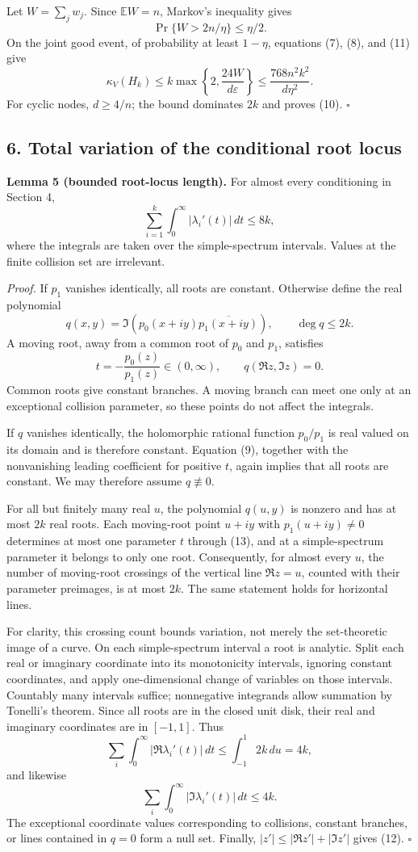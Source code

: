 \documentclass[
  11pt,
]{article}
\begin{document}
Let \(W=\sum_jw_j\). Since \(\mathbb EW=n\), Markov's inequality gives
\[
\Pr\{W>2n/\eta\}\leq\eta/2.
\] On the joint good event, of probability at least \(1-\eta\),
equations (7), (8), and (11) give \[
\kappa_V(H_k)
\leq k\max\left\{2,\frac{24W}{d\varepsilon}\right\}
\leq\frac{768n^2k^2}{d\eta^2}.
\] For cyclic nodes, \(d\geq4/n\); the bound dominates \(2k\) and proves
(10). \(\square\)

\subsection{6. Total variation of the conditional root
locus}\label{total-variation-of-the-conditional-root-locus}

\textbf{Lemma 5 (bounded root-locus length).} For almost every
conditioning in Section 4, \[
\sum_{i=1}^k\int_0^\infty|\lambda_i'(t)|\,dt\leq8k, \tag{12}
\] where the integrals are taken over the simple-spectrum intervals.
Values at the finite collision set are irrelevant.

\emph{Proof.} If \(p_1\) vanishes identically, all roots are constant.
Otherwise define the real polynomial \[
q(x,y)=\Im\left(p_0(x+iy)\overline{p_1(x+iy)}\right),
\qquad \deg q\leq2k.
\] A moving root, away from a common root of \(p_0\) and \(p_1\),
satisfies \[
t=-\frac{p_0(z)}{p_1(z)}\in(0,\infty),\qquad q(\Re z,\Im z)=0. \tag{13}
\] Common roots give constant branches. A moving branch can meet one
only at an exceptional collision parameter, so these points do not
affect the integrals.

If \(q\) vanishes identically, the holomorphic rational function
\(p_0/p_1\) is real valued on its domain and is therefore constant.
Equation (9), together with the nonvanishing leading coefficient for
positive \(t\), again implies that all roots are constant. We may
therefore assume \(q\not\equiv0\).

For all but finitely many real \(u\), the polynomial \(q(u,y)\) is
nonzero and has at most \(2k\) real roots. Each moving-root point
\(u+iy\) with \(p_1(u+iy)\ne0\) determines at most one parameter \(t\)
through (13), and at a simple-spectrum parameter it belongs to only one
root. Consequently, for almost every \(u\), the number of moving-root
crossings of the vertical line \(\Re z=u\), counted with their parameter
preimages, is at most \(2k\). The same statement holds for horizontal
lines.

For clarity, this crossing count bounds variation, not merely the
set-theoretic image of a curve. On each simple-spectrum interval a root
is analytic. Split each real or imaginary coordinate into its
monotonicity intervals, ignoring constant coordinates, and apply
one-dimensional change of variables on those intervals. Countably many
intervals suffice; nonnegative integrands allow summation by Tonelli's
theorem. Since all roots are in the closed unit disk, their real and
imaginary coordinates are in \([-1,1]\). Thus \[
\sum_i\int_0^\infty|\Re\lambda_i'(t)|\,dt
\leq\int_{-1}^1 2k\,du=4k,
\] and likewise \[
\sum_i\int_0^\infty|\Im\lambda_i'(t)|\,dt\leq4k.
\] The exceptional coordinate values corresponding to collisions,
constant branches, or lines contained in \(q=0\) form a null set.
Finally, \(|z'|\leq|\Re z'|+|\Im z'|\) gives (12). \(\square\)
\end{document}
